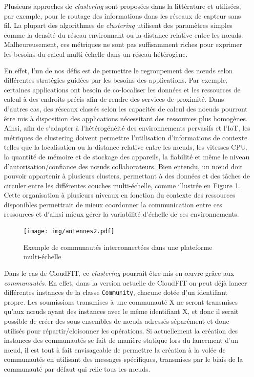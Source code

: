 Plusieurs approches de \textit{clustering} sont proposées dans la littérature \cite{Johnen2011} et utilisées, par exemple, pour  le routage des informations dans les réseaux de capteur sans fil. La plupart des algorithmes de \textit{clustering} utilisent des paramètres simples comme la densité du réseau environnant ou la distance relative entre les n{\oe}uds. Malheureusement, ces métriques ne sont pas suffisamment riches pour exprimer les besoins du calcul multi-échelle dans un réseau hétérogène. 

En effet, l'un de nos défis est de permettre le regroupement des n{\oe}uds selon différentes stratégies guidées par les besoins des applications. Par exemple, certaines applications ont besoin de co-localiser les données et les ressources de calcul à des endroits précis afin de rendre des services de proximité. Dans d'autres cas, des réseaux classés selon les capacités de calcul des n{oe}uds pourront être mis à disposition des applications nécessitant des ressources plus homogènes. Ainsi, afin de s'adapter à l'hétérogénéité des environnements pervasifs et l'IoT, les métriques de clustering doivent permettre l'utilisation d'informations de contexte telles que la localisation ou la distance relative entre les n{\oe}uds, les vitesses CPU, la quantité de mémoire et de stockage des appareils, la fiabilité et même le niveau d'autorisation/confiance des n{\oe}uds collaborateurs. Bien entendu, un n{\oe}ud doit pouvoir appartenir à plusieurs clusters, permettant à des données et des tâches de circuler entre les différentes couches multi-échelle, comme illustrée en Figure \ref{fig:antennes}. Cette organisation à plusieurs niveaux en fonction du contexte des ressources disponibles permettrait de mieux coordonner la communication entre ces ressources et d'ainsi mieux gérer la variabilité d'échelle de ces environnements. 


\begin{figure}[!ht]
	\centering
	\texttt{[image: img/antennes2.pdf]}
	\caption{Exemple de communautés interconnectées dans une plateforme multi-échelle}
	\label{fig:antennes}
\end{figure}


Dans le cas de CloudFIT, ce \textit{clustering} pourrait être mis en {\oe}uvre grâce aux \textit{communautés}. En effet, dans la version actuelle de CloudFIT on peut déjà lancer différentes instances de la classe \texttt{Community}, chacune dotée d'un identifiant propre. Les soumissions transmises à une communauté X ne seront transmises qu'aux n{\oe}uds ayant des instances avec le même identifiant X, et donc il serait possible de créer des sous-ensembles de n{\oe}uds adressés séparément et donc utilisés pour répartir/cloisonner les opérations. Si actuellement la création des instances des communautés se fait de manière statique lors du lancement d'un n{\oe}ud, il est tout à fait envisageable de permettre la création à la volée de communautés en utilisant des messages spécifiques, transmises par le biais de la communauté par défaut qui relie tous les n{\oe}uds.  

